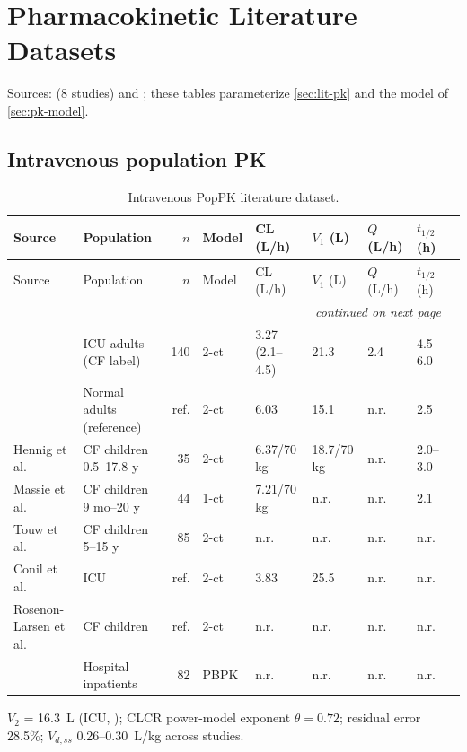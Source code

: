 \chapter{Pharmacokinetic Literature Datasets}
\label{chap:app-pklit}

Sources:  (8 studies) and ; these tables parameterize \cref{sec:lit-pk} and the model of \cref{sec:pk-model}.

\section{Intravenous population PK}
\begin{landscape}
\small\setlength{\tabcolsep}{3.6pt}
\begin{longtable}{p{2.8cm}p{2.6cm}rllllll}
\caption{Intravenous PopPK literature dataset.}\label{tab:ivpk-full}\\
\toprule
Source & Population & $n$ & Model & CL (L/h) & $V_1$ (L) & $Q$ (L/h) & $t_{1/2}$ (h)\\
\midrule
\endfirsthead
\toprule
Source & Population & $n$ & Model & CL (L/h) & $V_1$ (L) & $Q$ (L/h) & $t_{1/2}$ (h)\\
\midrule
\endhead
\midrule
\multicolumn{8}{r}{\emph{continued on next page}}\\
\endfoot
\bottomrule
\endlastfoot
\citet{Li2021} & ICU adults (CF label) & 140 & 2-ct & 3.27 (2.1--4.5) & 21.3 & 2.4 & 4.5--6.0\\
\citet{Li2021} & Normal adults (reference) & ref. & 2-ct & 6.03 & 15.1 & n.r. & 2.5\\
Hennig et al. & CF children 0.5--17.8 y & 35 & 2-ct & 6.37/70 kg & 18.7/70 kg & n.r. & 2.0--3.0\\
Massie et al. & CF children 9 mo--20 y & 44 & 1-ct & 7.21/70 kg & n.r. & n.r. & 2.1\\
Touw et al. & CF children 5--15 y & 85 & 2-ct & n.r. & n.r. & n.r. & n.r.\\
Conil et al. & ICU & ref. & 2-ct & 3.83 & 25.5 & n.r. & n.r.\\
Rosenon-Larsen et al. & CF children & ref. & 2-ct & n.r. & n.r. & n.r. & n.r.\\
\citet{Ferreira2021} & Hospital inpatients & 82 & PBPK & n.r. & n.r. & n.r. & n.r.\\
\end{longtable}
\end{landscape}
\noindent $V_2$ = 16.3~L (ICU, \citealt{Li2021}); CLCR power-model exponent $\theta = 0.72$; residual error 28.5\%; $V_{d,ss}$ 0.26--0.30~L/kg across studies.

